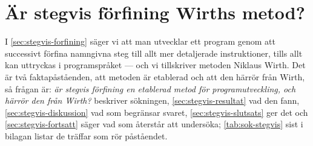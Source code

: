




\chapter{Är stegvis förfining Wirths metod?}
\label{app:stegvis-forfining}

I \cref{sec:stegvis-forfining} säger vi att man utvecklar ett program genom
att successivt förfina namngivna steg till allt mer detaljerade
instruktioner, tills allt kan uttryckas i programspråket --- och vi
tillskriver metoden Niklaus Wirth\autocite{wirth1971}.  Det är två
faktapåståenden, att metoden är etablerad och att den härrör från Wirth,
så frågan är: \emph{är stegvis förfining en etablerad metod för
programutveckling, och härrör den från Wirth?}  
beskriver sökningen, \cref{sec:stegvis-resultat} vad den fann,
\cref{sec:stegvis-diskussion} vad som begränsar svaret,
\cref{sec:stegvis-slutsats} ger det och \cref{sec:stegvis-fortsatt}
säger vad som återstår att undersöka; \cref{tab:sok-stegvis} sist i
bilagan listar de träffar som rör påståendet.

